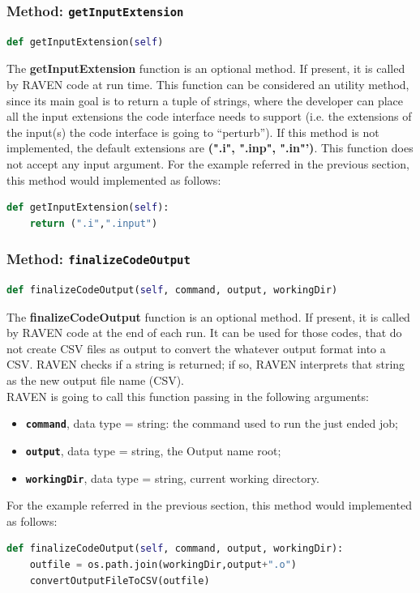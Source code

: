 \subsubsection{Method: \texttt{getInputExtension}} 
\label{subsubsec:getInputExtension}
\begin{lstlisting}[language=python]
def getInputExtension(self)
\end{lstlisting}
The \textbf{getInputExtension} function is an optional method. If present, it is called 
by RAVEN code at run time.  This function can be considered an utility method, since its
main goal is to return a tuple of strings, where the developer can place all the input extensions
the code interface needs to support (i.e. the extensions of the input(s) the code interface
is going to ``perturb''). If this method is not implemented, the default extensions are  \textbf{(".i", ".inp", ".in"')}.
This function does not accept any input argument.
For the example referred in the previous section, this method would implemented as follows:
\newline
\begin{lstlisting}[language=python]
def getInputExtension(self):
    return (".i",".input")
\end{lstlisting}


\subsubsection{Method: \texttt{finalizeCodeOutput}} 
\label{subsubsec:finializeCodeOutput}
\begin{lstlisting}[language=python]
def finalizeCodeOutput(self, command, output, workingDir)
\end{lstlisting}
The \textbf{finalizeCodeOutput} function is an optional method. If present, it is called 
by RAVEN code at the end of each run. It can be used for those codes, that do not create CSV 
files as output to convert the whatever output format into a CSV. RAVEN checks if a string is returned; 
if so, RAVEN interprets that string as the new output file name (CSV).
\\RAVEN is going to call this function passing in the following arguments:
\begin{itemize}
  \item \textbf{\texttt{command}}, data type = string: the command used to run 
                    the just ended job;
  \item \textbf{\texttt{output}}, data type = string, the Output name root;
  \item  \textbf{\texttt{workingDir}}, data type = string, current working directory.
\end{itemize}
For the example referred in the previous section, this method would implemented as follows:
\newline
\begin{lstlisting}[language=python]
def finalizeCodeOutput(self, command, output, workingDir):
    outfile = os.path.join(workingDir,output+".o")
    convertOutputFileToCSV(outfile)
 \end{lstlisting} 
 
